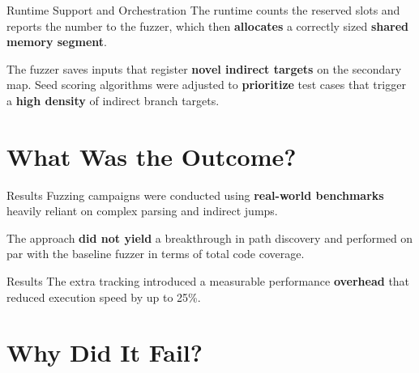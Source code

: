 \documentclass[aspectratio=169]{beamer}
\begin{document}
  \begin{frame}{Runtime Support and Orchestration}
    The runtime counts the reserved slots and reports the number to the fuzzer, which then \textbf{allocates} a correctly sized \textbf{shared memory segment}.

    \begin{center}
        \hspace*{-1.5cm}
        
    \end{center}

    \vspace*{-0.2cm}
    The fuzzer saves inputs that register \textbf{novel indirect targets} on the secondary map. Seed scoring algorithms were adjusted to \textbf{prioritize} test cases that trigger a \textbf{high density} of indirect branch targets.

    

  \end{frame}

  \section{What Was the Outcome?}
  
  \begin{frame}{Results}
    Fuzzing campaigns were conducted using \textbf{real-world benchmarks} heavily reliant on complex parsing and indirect jumps.
    
    

    The approach \textbf{did not yield} a breakthrough in path discovery and performed on par with the baseline fuzzer in terms of total code coverage.
  \end{frame}

  \begin{frame}{Results}
    The extra tracking introduced a measurable performance \textbf{overhead} that reduced execution speed by up to 25\%.

    
  \end{frame}

  \section{Why Did It Fail?}
\end{document}
